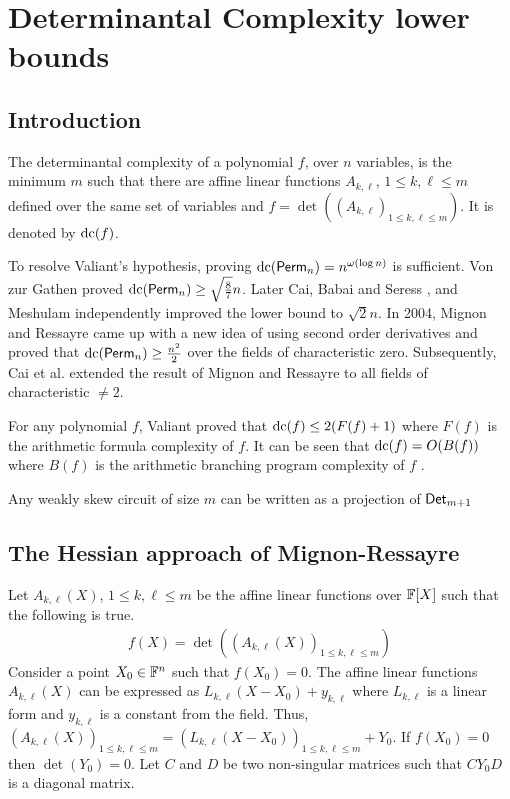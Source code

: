 \chapter{Determinantal Complexity lower bounds}
\section{Introduction}
\begin{definition}
  The determinantal complexity of a polynomial $f$, over $n$ variables, is the minimum $m$ such that there are affine linear functions $A_{k,\ell}$, $1\leq k,\ell\leq m$ defined over the same set of variables and $f= \det((A_{k,\ell})_{1 \leq k,\ell \leq m})$. It is denoted by $\mathrm{dc}(f)$.  
\end{definition}
To resolve Valiant's hypothesis, proving $\mathrm{dc}(\mathsf{Perm}_n) = n^{\omega(\log n)}$ is sufficient. Von zur Gathen \cite{von1986}  proved $\mathrm{dc}(\mathsf{Perm}_n) \geq \sqrt{\frac{8}{7}}n$. Later Cai\cite{cai1990}, Babai and Seress \cite{von1987}, and Meshulam\cite{mesh1989} independently improved the lower bound to $\sqrt{2}n$. In 2004, Mignon and Ressayre\cite{mt2004} came up with a new idea of using second order derivatives and proved that $\mathrm{dc}(\mathsf{Perm}_n) \geq \frac{n^2}{2}$ over the fields of characteristic zero. Subsequently, Cai et al.\cite{ccl2008} extended the result of Mignon and Ressayre to all fields of characteristic $\neq 2$.

For any polynomial $f$, Valiant\cite{val1979} proved that $\mathrm{dc}(f) \leq 2(F(f)+ 1)$ where $F(f)$ is the arithmetic formula complexity of $f$. It can be seen that $\mathrm{dc}(f) = O(B(f))$ where $B(f)$ is the arithmetic branching program complexity of $f$ \cite{mp2008}.

\begin{remark}
  Any weakly skew circuit of size $m$ can be written as a projection of $\mathsf{Det}_{m+1}$
\end{remark}


\section{The Hessian approach of Mignon-Ressayre}

 Let $A_{k,\ell}(X)$, $1\leq k,\ell\leq m$ be the affine linear functions over $\mathbb{F}[X]$ such that the following is true.
\begin{align*}
  f(X) = \det((A_{k,\ell}(X))_{1\leq k,\ell\leq m})
\end{align*}
 Consider a point $X_0\in \mathbb{F}^{n}$ such that $f(X_0)=0$. The affine linear functions $A_{k,\ell}(X)$ can be expressed as $L_{k,\ell}(X-X_0) + y_{k,\ell}$ where $L_{k,\ell}$ is a linear form and $y_{k,\ell}$ is a constant from the field. Thus, $(A_{k,\ell}(X))_{1\leq k,\ell\leq m} = (L_{k,\ell}(X-X_0))_{1\leq k,\ell\leq m} + Y_0$. If $f(X_0)=0$ then $\det(Y_0)=0$. Let $C$ and $D$ be two non-singular matrices such that $CY_0D$ is a diagonal matrix.

